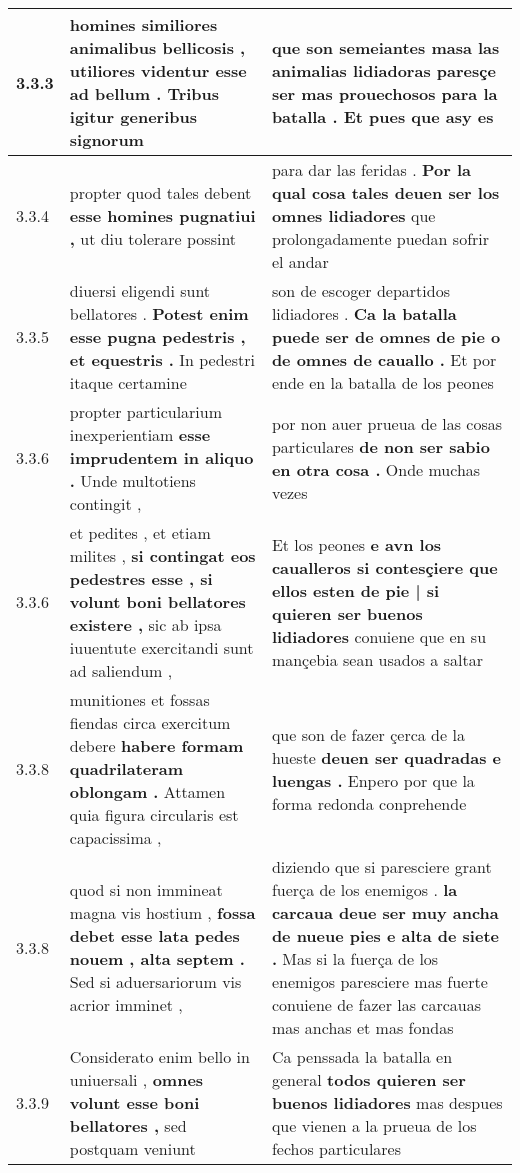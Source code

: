 \begin{tabular}{|p{1cm}|p{6.5cm}|p{6.5cm}|}
3.3.3 & homines similiores animalibus bellicosis , \textbf{ utiliores videntur esse ad bellum . } Tribus igitur generibus signorum & que son semeiantes masa las animalias lidiadoras \textbf{ paresçe ser mas prouechosos para la batalla . } Et pues que asy es \\\hline
3.3.4 & propter quod tales debent \textbf{ esse homines pugnatiui , } ut diu tolerare possint & para dar las feridas . \textbf{ Por la qual cosa tales deuen ser los omnes lidiadores } que prolongadamente puedan sofrir el andar \\\hline
3.3.5 & diuersi eligendi sunt bellatores . \textbf{ Potest enim esse pugna pedestris , et equestris . } In pedestri itaque certamine & son de escoger departidos lidiadores . \textbf{ Ca la batalla puede ser de omnes de pie o de omnes de cauallo . } Et por ende en la batalla de los peones \\\hline
3.3.6 & propter particularium inexperientiam \textbf{ esse imprudentem in aliquo . } Unde multotiens contingit , & por non auer prueua de las cosas particulares \textbf{ de non ser sabio en otra cosa . } Onde muchas vezes \\\hline
3.3.6 & et pedites , et etiam milites , \textbf{ si contingat eos pedestres esse , si volunt boni bellatores existere , } sic ab ipsa iuuentute exercitandi sunt ad saliendum , & Et los peones \textbf{ e avn los caualleros si contesçiere que ellos esten de pie | si quieren ser buenos lidiadores } conuiene que en su mançebia sean usados a saltar \\\hline
3.3.8 & munitiones et fossas fiendas circa exercitum debere \textbf{ habere formam quadrilateram oblongam . } Attamen quia figura circularis est capacissima , & que son de fazer çerca de la hueste \textbf{ deuen ser quadradas e luengas . } Enpero por que la forma redonda conprehende \\\hline
3.3.8 & quod si non immineat magna vis hostium , \textbf{ fossa debet esse lata pedes nouem , alta septem . } Sed si aduersariorum vis acrior imminet , & diziendo que si paresciere grant fuerça de los enemigos . \textbf{ la carcaua deue ser muy ancha de nueue pies e alta de siete . } Mas si la fuerça de los enemigos paresciere mas fuerte conuiene de fazer las carcauas mas anchas et mas fondas \\\hline
3.3.9 & Considerato enim bello in uniuersali , \textbf{ omnes volunt esse boni bellatores , } sed postquam veniunt & Ca penssada la batalla en general \textbf{ todos quieren ser buenos lidiadores } mas despues que vienen a la prueua de los fechos particulares \\\hline

\end{tabular}
